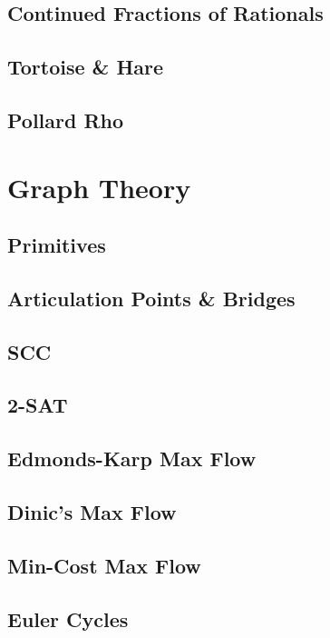 		\subsection{Continued Fractions of Rationals}
			
		\subsection{Tortoise \& Hare}
			
		\subsection{Pollard Rho}
			
	\section{Graph Theory}
		\subsection{Primitives}
			
		\subsection{Articulation Points \& Bridges}
			
		\subsection{SCC}
			
		\subsection{2-SAT}
			
		\subsection{Edmonds-Karp Max Flow}
			
		\subsection{Dinic's Max Flow}
			
		\subsection{Min-Cost Max Flow}
			
		\subsection{Euler Cycles}
			
